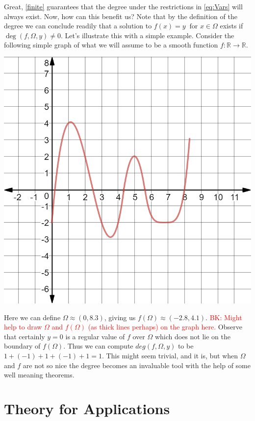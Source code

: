 \documentclass[11pt]{article}
\theoremstyle{plain}
\theoremstyle{definition}
\theoremstyle{remark}
\newcommand{\delete}[1]{\textcolor{red}{#1}}
\begin{document}
Great, \cref{finite} guarantees that the degree under the restrictions in \eqref{eq:Vars} will always exist. Now, how can this benefit us?
Note that by the definition of the degree we can conclude readily that a solution to $f(x)=y \ \text{ for } x\in\Omega$ exists if $\operatorname{deg}\left(f,\Omega,y\right)\neq 0$. Let's illustrate this with a simple example. Consider the following simple graph of what we will assume to be a smooth function $f:\mathbb{R}\rightarrow\mathbb{R}$. 
\begin{center}
\includegraphics[scale=0.25]{Figures/Curve1}
\end{center}

Here we can define $\Omega\approx (0,8.3)$, giving us $f(\Omega)\approx (-2.8,4.1)$. \delete{BK: Might help to draw $\Omega$ and $f(\Omega)$ (as thick lines perhaps) on the graph here.}
Observe that certainly $y=0$ is a regular value of $f$ over $\Omega$ which does not lie on the boundary of $f(\Omega)$.
Thus we can compute $deg\left(f,\Omega,y\right)$ to be $1+(-1)+1+(-1)+1=1$.
This might seem trivial, and it is, but when $\Omega$ and $f$ are not so nice the degree becomes an invaluable tool with the help of some well meaning theorems. 

\newpage

\section{Theory for Applications}
\end{document}
